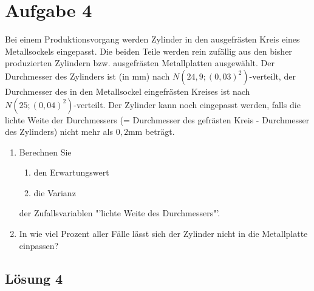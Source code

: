 \documentclass[main.tex]{subfiles}
\begin{document}
\section{Aufgabe 4}
Bei einem Produktionsvorgang werden Zylinder in den ausgefrästen Kreis eines Metallsockels eingepasst. Die beiden Teile werden rein zufällig aus den bisher produzierten Zylindern bzw. ausgefrästen Metallplatten ausgewählt. Der Durchmesser des Zylinders ist (in mm) nach $N(24,9; (0,03)^2)$-verteilt, der Durchmesser des in den Metallsockel eingefrästen Kreises ist nach $N(25; (0,04)^2)$-verteilt. Der Zylinder kann noch eingepasst werden, falls die lichte Weite der Durchmessers (= Durchmesser des gefrästen Kreis - Durchmesser des Zylinders) nicht mehr als $0,2$mm beträgt. 
\begin{enumerate}
\item Berechnen Sie 
\begin{enumerate}
\item den Erwartungswert
\item die Varianz
\end{enumerate}
der Zufallsvariablen "'lichte Weite des Durchmessers"'.
\item In wie viel Prozent aller Fälle lässt sich der Zylinder nicht in die Metallplatte einpassen?
\end{enumerate}


\subsection{Lösung 4}
\end{document}
